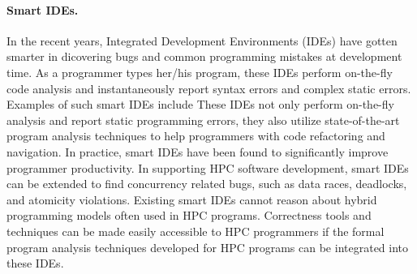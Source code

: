       \paragraph{Smart IDEs.}  In the recent years, Integrated Development Environments (IDEs) have gotten smarter in dicovering bugs and common programming mistakes at development time.  As a programmer types her/his program, these IDEs perform on-the-fly code analysis and instantaneously report syntax errors and complex static errors.  Examples of such smart IDEs include  These IDEs not only perform on-the-fly analysis and report static programming errors, they also utilize state-of-the-art program analysis techniques to help programmers with code refactoring and navigation.  In practice, smart IDEs have been found to significantly improve programmer productivity.  
%
%
In supporting HPC software development, smart IDEs can be extended to find concurrency related bugs, such as data races, deadlocks, and atomicity violations. Existing smart IDEs cannot reason about hybrid programming models often used in HPC programs.  Correctness tools and techniques can be made easily accessible to HPC programmers if the formal program analysis techniques developed for HPC programs can be integrated into these IDEs.  %

